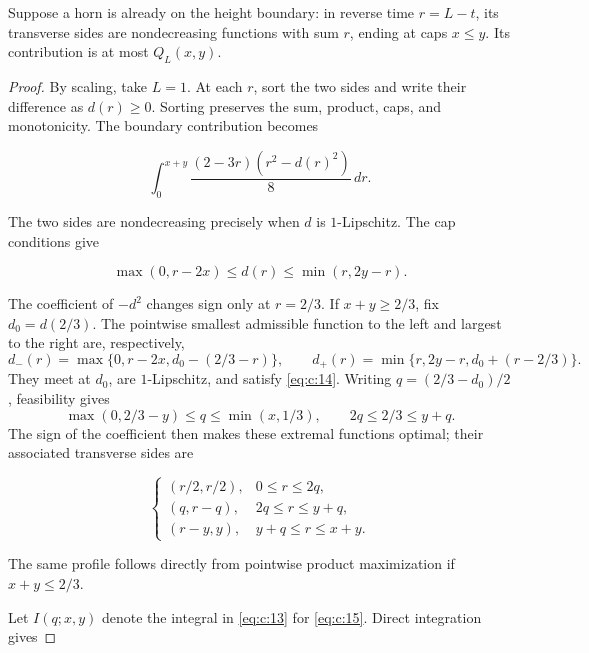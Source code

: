 \begin{lemma}\label{lemma:c:3.1}

Suppose a horn is already on the height boundary: in reverse time
\(r=L-t\), its transverse sides are nondecreasing functions with sum \(r\),
ending at caps \(x\le y\). Its contribution is at most \(Q_L(x,y)\).

\end{lemma}
\begin{proof}

By scaling, take \(L=1\). At each \(r\), sort the two sides and write their
difference as \(d(r)\ge0\). Sorting preserves the sum, product, caps, and
monotonicity. The boundary contribution becomes

\begin{equation}
\int_0^{x+y}\frac{(2-3r)(r^2-d(r)^2)}8\,dr.
\label{eq:c:13}
\end{equation}

The two sides are nondecreasing precisely when \(d\) is \(1\)-Lipschitz.
The cap conditions give

\begin{equation}
\max(0,r-2x)\le d(r)\le\min(r,2y-r).
\label{eq:c:14}
\end{equation}

The coefficient of \(-d^2\) changes sign only at \(r=2/3\). If
\(x+y\ge2/3\), fix \(d_0=d(2/3)\). The pointwise smallest admissible
function to the left and largest to the right are, respectively,
\[
d_-(r)=\max\{0,r-2x,d_0-(2/3-r)\},\qquad
d_+(r)=\min\{r,2y-r,d_0+(r-2/3)\}.
\]
They meet at \(d_0\), are \(1\)-Lipschitz, and satisfy \eqref{eq:c:14}.
Writing \(q=(2/3-d_0)/2\), feasibility gives
\[
\max(0,2/3-y)\le q\le\min(x,1/3),
\qquad 2q\le2/3\le y+q.
\]
The sign of the coefficient then makes these extremal functions optimal;
their associated transverse sides are

\begin{equation}
\begin{cases}
(r/2,r/2),&0\le r\le2q,\\
(q,r-q),&2q\le r\le y+q,\\
(r-y,y),&y+q\le r\le x+y.
\end{cases}
\label{eq:c:15}
\end{equation}

The same profile follows directly from pointwise product maximization if
\(x+y\le2/3\).

Let \(I(q;x,y)\) denote the integral in \eqref{eq:c:13} for \eqref{eq:c:15}. Direct integration
gives


\end{proof}
